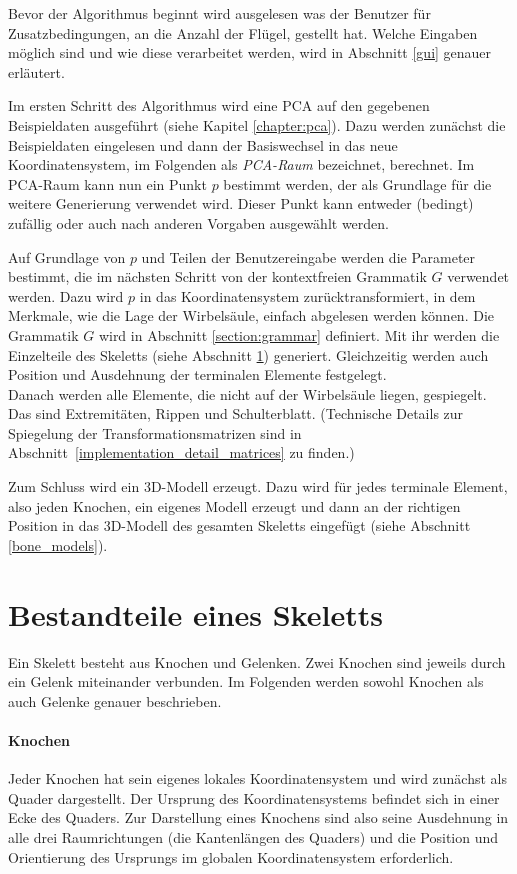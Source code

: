 Bevor der Algorithmus beginnt wird ausgelesen was der Benutzer für Zusatzbedingungen, \zb an die Anzahl der Flügel, gestellt hat. Welche Eingaben möglich sind und wie diese verarbeitet werden, wird in Abschnitt \ref{gui} genauer erläutert.

Im ersten Schritt des Algorithmus wird eine PCA auf den gegebenen Beispieldaten ausgeführt (siehe Kapitel \ref{chapter:pca}). Dazu werden zunächst die Beispieldaten eingelesen und dann der Basiswechsel in das neue Koordinatensystem, im Folgenden als \emph{PCA-Raum} bezeichnet, berechnet. Im PCA-Raum kann nun ein Punkt $p$ bestimmt werden, der als Grundlage für die weitere Generierung verwendet wird. Dieser Punkt kann entweder (bedingt) zufällig oder auch nach anderen Vorgaben ausgewählt werden. 

Auf Grundlage von $p$ und Teilen der Benutzereingabe werden die Parameter bestimmt, die im nächsten Schritt von der kontextfreien Grammatik $G$ verwendet werden. Dazu wird $p$ in das Koordinatensystem zurücktransformiert, in dem Merkmale, wie die Lage der Wirbelsäule, einfach abgelesen werden können. Die Grammatik $G$ wird in Abschnitt \ref{section:grammar} definiert. Mit ihr werden die Einzelteile des Skeletts (siehe Abschnitt \ref{skeleton_parts}) generiert. Gleichzeitig werden auch Position und Ausdehnung der terminalen Elemente festgelegt.\\
Danach werden alle Elemente, die nicht auf der Wirbelsäule liegen, gespiegelt. Das sind Extremitäten, Rippen und Schulterblatt. (Technische Details zur Spiegelung der Transformationsmatrizen sind in \mbox{Abschnitt \ref{implementation_detail_matrices}} zu finden.)

Zum Schluss wird ein 3D-Modell erzeugt. Dazu wird für jedes terminale Element, also jeden Knochen, ein eigenes Modell erzeugt und dann an der richtigen Position in das 3D-Modell des gesamten Skeletts eingefügt (siehe Abschnitt \ref{bone_models}). 


\section{Bestandteile eines Skeletts}
\label{skeleton_parts}

Ein Skelett besteht aus Knochen und Gelenken. Zwei Knochen sind jeweils durch ein Gelenk miteinander verbunden. Im Folgenden werden sowohl Knochen als auch Gelenke genauer beschrieben.

\paragraph{Knochen}
Jeder Knochen hat sein eigenes lokales Koordinatensystem und wird zunächst als Quader dargestellt. Der Ursprung des Koordinatensystems befindet sich in einer Ecke des Quaders.
Zur Darstellung eines Knochens sind also
seine Ausdehnung in alle drei Raumrichtungen (die Kantenlängen des Quaders) und die Position und Orientierung des Ursprungs im globalen Koordinatensystem erforderlich.

